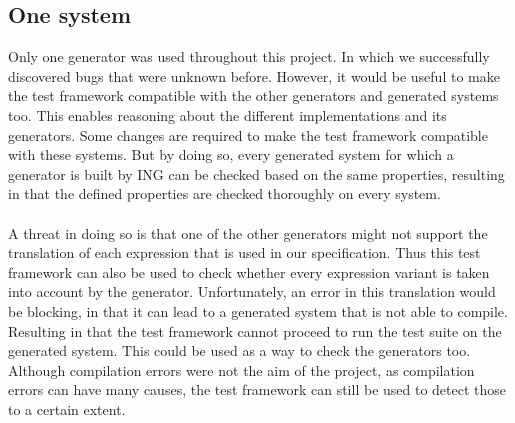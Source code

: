 \subsection*{One system}
Only one generator was used throughout this project. In which we successfully discovered bugs that were unknown before. However, it would be useful to make the test framework compatible with the other generators and generated systems too. This enables reasoning about the different implementations and its generators. Some changes are required to make the test framework compatible with these systems. But by doing so, every generated system for which a generator is built by ING can be checked based on the same properties, resulting in that the defined properties are checked thoroughly on every system.\\
\\
A threat in doing so is that one of the other generators might not support the translation of each expression that is used in our specification. Thus this test framework can also be used to check whether every expression variant is taken into account by the generator. Unfortunately, an error in this translation would be blocking, in that it can lead to a generated system that is not able to compile. Resulting in that the test framework cannot proceed to run the test suite on the generated system. This could be used as a way to check the generators too. Although compilation errors were not the aim of the project, as compilation errors can have many causes, the test framework can still be used to detect those to a certain extent.
























